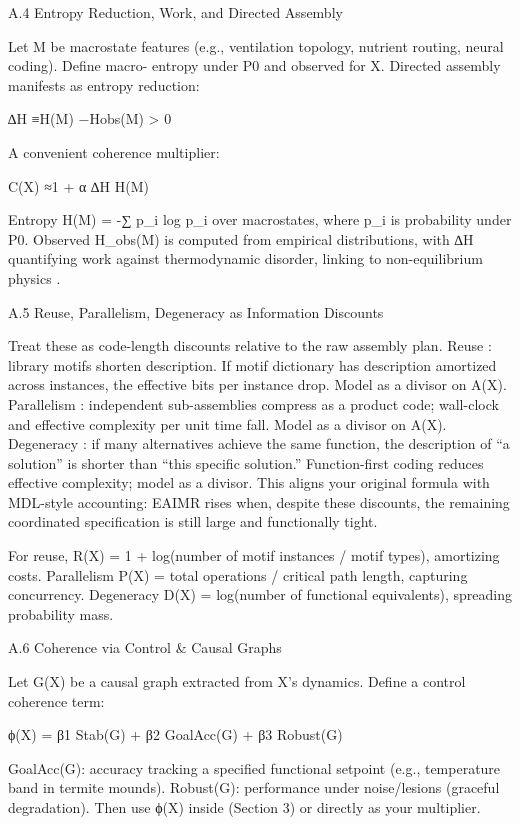 \documentclass{article}
\begin{document}
A.4
Entropy Reduction, Work, and Directed Assembly

Let M be macrostate features (e.g., ventilation topology, nutrient routing, neural coding). Define macro-
entropy under P0 and observed for X.
Directed assembly manifests as entropy reduction:

∆H ≡H(M) −Hobs(M)
> 0

A convenient coherence multiplier:

C(X) ≈1 + α
∆H
H(M)

Entropy H(M) = -∑ p_i log p_i over macrostates, where p_i is probability under P0. Observed H_obs(M) is computed from empirical distributions, with ∆H quantifying work against thermodynamic disorder, linking to non-equilibrium physics \citep{friston2010free}.

A.5
Reuse, Parallelism, Degeneracy as Information Discounts

Treat these as code-length discounts relative to the raw assembly plan.
Reuse : library motifs shorten description. If motif dictionary has description amortized across instances,
the effective bits per instance drop. Model as a divisor on A(X).
Parallelism : independent sub-assemblies compress as a product code; wall-clock and effective complexity
per unit time fall. Model as a divisor on A(X).
Degeneracy : if many alternatives achieve the same function, the description of “a solution” is shorter
than “this specific solution.” Function-first coding reduces effective complexity; model as a divisor.
This aligns your original formula with MDL-style accounting: EAIMR rises when, despite these discounts,
the remaining coordinated specification is still large and functionally tight.

For reuse, R(X) = 1 + log(number of motif instances / motif types), amortizing costs. Parallelism P(X) = total operations / critical path length, capturing concurrency. Degeneracy D(X) = log(number of functional equivalents), spreading probability mass.

A.6
Coherence via Control & Causal Graphs

Let G(X) be a causal graph extracted from X’s dynamics. Define a control coherence term:

ϕ(X) = β1 Stab(G) + β2 GoalAcc(G) + β3 Robust(G)

GoalAcc(G): accuracy tracking a specified functional setpoint (e.g., temperature band in termite mounds).
Robust(G): performance under noise/lesions (graceful degradation).
Then use ϕ(X) inside (Section 3) or directly as your multiplier.
\end{document}
